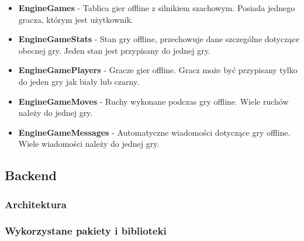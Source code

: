 \documentclass[12pt,a4paper]{article}
\begin{document}
\begin{itemize}
    \item \textbf{EngineGames} - Tablica gier offline z silnikiem szachowym. Posiada jednego gracza, którym jest użytkownik.
    \item \textbf{EngineGameStats} - Stan gry offline, przechowuje dane szczególne dotyczące obecnej gry. Jeden stan jest przypisany do jednej gry.
    \item \textbf{EngineGamePlayers} - Gracze gier offline. Gracz może być przypisany tylko do jeden gry jak biały lub czarny.
    \item \textbf{EngineGameMoves} - Ruchy wykonane podczas gry offline. Wiele ruchów należy do jednej gry.
    \item \textbf{EngineGameMessages} - Automatyczne wiadomości dotyczące gry offline. Wiele wiadomości należy do jednej gry.
\end{itemize}


    \subsection{Backend}
        \subsubsection{Architektura}



        \subsubsection{Wykorzystane pakiety i biblioteki}
\end{document}
